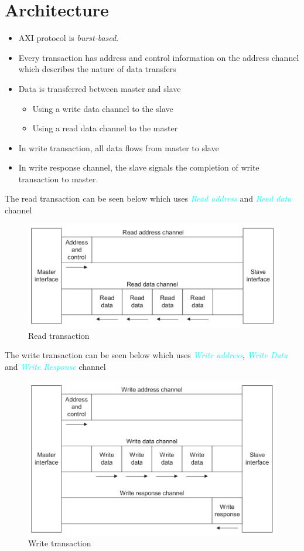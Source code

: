 \documentclass{article}
\newcommand{\chFormat}[1]{\emph{\textcolor{cyan}{#1}}}
\begin{document}
\section{Architecture}
\begin{itemize}
    \item AXI protocol is \emph{burst-based}.
    \item Every transaction has address and control information on the address channel which describes the nature of data transfers
    \item Data is transferred between master and slave
          \begin{itemize}
              \item Using a write data channel to the slave
              \item Using a read data channel to the master
          \end{itemize}
    \item In write transaction, all data flows from master to slave
    \item In write response channel, the slave signals the completion of write transaction to master.
\end{itemize}
\quad The read transaction can be seen below which uses \chFormat{Read address} and \chFormat{Read data} channel
\begin{figure}[H]
    \centering
    \includegraphics[width=1\textwidth]{Resources/ReadTransaction.png}
    \caption{Read transaction}
\end{figure}

\quad The write transaction can be seen below which uses \chFormat{Write address}, \chFormat{Write Data} and \chFormat{Write Response} channel
\begin{figure}[H]
    \centering
    \includegraphics[width=1\textwidth]{Resources/WriteTransaction.png}
    \caption{Write transaction}
\end{figure}
\end{document}
